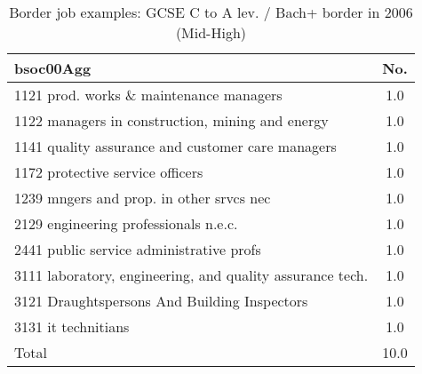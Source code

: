 \begin{table}[h!]
	\centering
	\caption{Border job examples: GCSE C to A lev. / Bach+ border in 2006 (Mid-High)}
	\begin{tabular}{lc}
	\toprule
bsoc00Agg&No. \\
\hline
1121 prod. works \& maintenance managers&1.0 \\
1122 managers in construction, mining and energy&1.0 \\
1141 quality assurance and customer care managers&1.0 \\
1172 protective service officers&1.0 \\
1239 mngers and prop. in other srvcs nec&1.0 \\
2129 engineering professionals n.e.c.&1.0 \\
2441 public service administrative profs&1.0 \\
3111 laboratory, engineering, and quality assurance tech.&1.0 \\
3121 Draughtspersons And Building Inspectors&1.0 \\
3131 it technitians&1.0 \\
Total&10.0 \\
\bottomrule
\bottomrule
\end{tabular}
\end{table}
